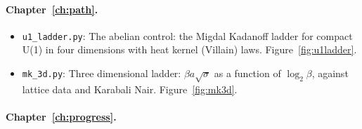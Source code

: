 \paragraph{Chapter~\ref{ch:path}.}\nopagebreak
\begin{itemize}\setlength{\itemsep}{0pt}\setlength{\parskip}{0pt}
\item \texttt{u1\_ladder.py}: The abelian control: the Migdal Kadanoff ladder for compact U(1) in four dimensions with heat kernel (Villain) laws. Figure~\ref{fig:u1ladder}.
\item \texttt{mk\_3d.py}: Three dimensional ladder: $\beta a\sqrt{\sigma}$ as a function of $\log_2\beta$, against lattice data and Karabali Nair. Figure~\ref{fig:mk3d}.
\end{itemize}
\paragraph{Chapter~\ref{ch:progress}.}\nopagebreak
